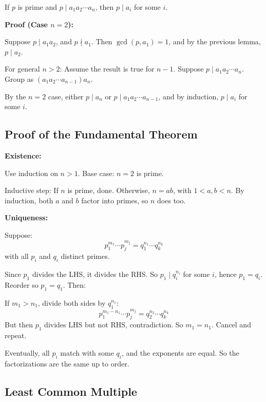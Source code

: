 If \(p\) is prime and \(p \mid a_1a_2 \cdots a_n\), then \(p \mid a_i\) for some \(i\).
\vspace{\baselineskip}

\textbf{Proof (Case \(n=2\)):} 

Suppose \(p \mid a_1a_2\), and \(p \nmid a_1\).
Then \(\gcd(p, a_1) = 1\), and by the previous lemma, \(p \mid a_2\).

For general \(n > 2\): Assume the result is true for \(n-1\). Suppose \(p \mid a_1a_2 \cdots a_n\).
Group as \((a_1a_2 \cdots a_{n-1})a_n\).

By the \(n=2\) case, either \(p \mid a_n\) or \(p \mid a_1a_2 \cdots a_{n-1}\), and by induction, \(p \mid a_i\) for some \(i\).

\QED

\subsection{Proof of the Fundamental Theorem}

\textbf{Existence:}

Use induction on \(n > 1\).
Base case: \(n = 2\) is prime.
\vspace{\baselineskip}

Inductive step: If \(n\) is prime, done. Otherwise, \(n = ab\), with \(1 < a, b < n\).
By induction, both \(a\) and \(b\) factor into primes, so \(n\) does too.
\vspace{\baselineskip}

\textbf{Uniqueness:}

Suppose:
\[
	p_1^{m_1} \cdots p_j^{m_j} = q_1^{n_1} \cdots q_k^{n_k}
\]
with all \(p_i\) and \(q_i\) distinct primes.
\vspace{\baselineskip}

Since \(p_1\) divides the LHS, it divides the RHS. So \(p_1 \mid q_i^{n_i}\) for some \(i\), hence \(p_1 = q_i\).
Reorder so \(p_1 = q_1\). Then:

If \(m_1 > n_1\), divide both sides by \(q_1^{n_1}\):
\[
	p_1^{m_1-n_1} \cdots p_j^{m_j} = q_2^{n_2} \cdots q_k^{n_k}
\]
But then \(p_1\) divides LHS but not RHS, contradiction. So \(m_1 = n_1\). Cancel and repeat.

Eventually, all \(p_i\) match with some \(q_i\), and the exponents are equal. So the factorizations are the same up to order.

\QED

\subsection{Least Common Multiple}

